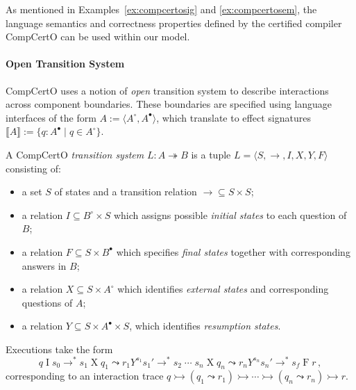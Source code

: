 \documentclass[acmsmall,screen,review,nonacm]{acmart}
\newcommand{\que}{\circ}
\newcommand{\ans}{\bullet}
\begin{document}
As mentioned in Examples~\ref{ex:compcertosig} and \ref{ex:compcertosem},
the language semantics and correctness properties
defined by the certified compiler CompCertO
can be used within our model.

\paragraph{Open Transition System}
CompCertO
uses a notion of \emph{open} transition system
to describe interactions across component boundaries.
These boundaries are specified using
language interfaces of the form
$A := \langle A^\que, A^\ans \rangle$,
which translate to effect signatures
$\llbracket A \rrbracket := \{ q : A^\ans \mid q \in A^\que \}$.

A CompCertO \emph{transition system} $L : A \twoheadrightarrow B$
is a tuple $L = \langle S, {\rightarrow}, I, X, Y, F \rangle$
consisting of:
\begin{itemize}
  \item a set $S$ of states and
    a transition relation ${\rightarrow} \subseteq S \times S$;
  \item a relation $I \subseteq B^\que \times S$
    which assigns possible \emph{initial states}
    to each question of $B$;
  \item a relation $F \subseteq S \times B^\ans$
    which specifies \emph{final states} together with
    corresponding answers in $B$;
  \item a relation $X \subseteq S \times A^\que$
    which identifies \emph{external states} and
    corresponding questions of $A$;
  \item a relation $Y \subseteq S \times A^\ans \times S$,
    which identifies \emph{resumption states}.
\end{itemize}
Executions take the form
\[
  q \mathrel{I} s_0 \rightarrow^*
  s_1 \mathrel{X} q_1 \leadsto
  r_1 \mathrel{Y^{s_1}} s_1' \rightarrow^*
  s_2 \mathrel{\cdots}
  s_n \mathrel{X} q_n \leadsto
  r_n \mathrel{Y^{s_n}} s_n' \rightarrow^*
  s_f \mathrel{F} r
  \,,
\]
corresponding to an interaction trace
$
  q \rightarrowtail
  (q_1 \leadsto r_1) \rightarrowtail
  \cdots \rightarrowtail
  (q_n \leadsto r_n) \rightarrowtail
  r
$.

\end{document}
